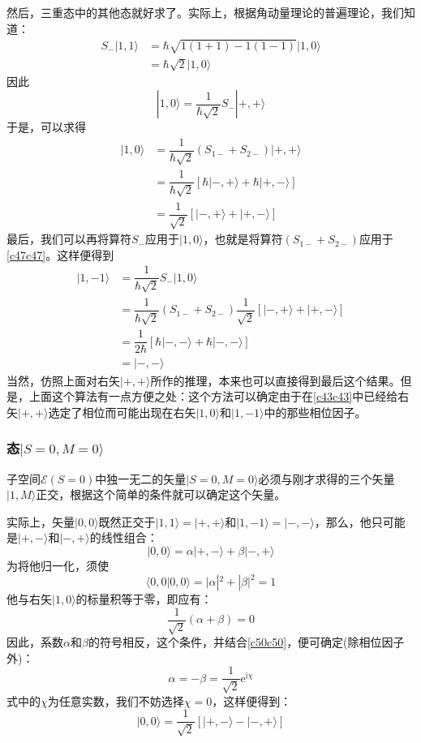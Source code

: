 \documentclass[]{article}
\begin{document}
然后，三重态中的其他态就好求了。实际上，根据角动量理论的普遍理论，我们知道：
\begin{align}
	S_-|1,1\rangle&=\hbar\sqrt{1(1+1)-1(1-1)}|1,0\rangle\nonumber\\
	&=\hbar\sqrt{2}|1,0\rangle
\end{align}
因此
\begin{equation}
	|1,0\rangle=\dfrac{1}{\hbar\sqrt{2}}S_-|+,+\rangle
	\label{c45c45}
\end{equation}
于是，可以求得
\begin{align}
	|1,0\rangle&=\dfrac{1}{\hbar\sqrt{2}}(S_{1-}+S_{2-})|+,+\rangle\nonumber\\
	&=\dfrac{1}{\hbar\sqrt{2}}[\hbar|-,+\rangle+\hbar|+,-\rangle]\nonumber\\
	&=\dfrac{1}{\sqrt{2}}[|-,+\rangle+|+,-\rangle]
	\label{c47c47}
\end{align}
最后，我们可以再将算符$S_-$应用于$|1,0\rangle$，也就是将算符$(S_{1-}+S_{2-})$应用于\eqref{c47c47}。这样便得到
\begin{align}
	|1,-1\rangle&=\dfrac{1}{\hbar\sqrt{2}}S_-|1,0\rangle\nonumber\\
	&=\dfrac{1}{\hbar\sqrt{2}}(S_{1-}+S_{2-})\dfrac{1}{\sqrt{2}}[|-,+\rangle+|+,-\rangle]\nonumber\\
	&=\dfrac{1}{2\hbar}[\hbar|-,-\rangle+\hbar|-,-\rangle]\nonumber\\
	&=|-,-\rangle
\end{align}
当然，仿照上面对右矢$|+,+\rangle$所作的推理，本来也可以直接得到最后这个结果。但是，上面这个算法有一点方便之处：这个方法可以确定由于在\eqref{c43c43}中已经给右矢$|+,+\rangle$选定了相位而可能出现在右矢$|1,0\rangle$和$|1,-1\rangle$中的那些相位因子。
\subsubsection{态$|S=0,M=0\rangle$}
子空间$\mathscr{E}(S=0)$中独一无二的矢量$|S=0,M=0\rangle$必须与刚才求得的三个矢量$|1,M\rangle$正交，根据这个简单的条件就可以确定这个矢量。\par 
实际上，矢量$|0,0\rangle$既然正交于$|1,1\rangle=|+,+\rangle$和$|1,-1\rangle=|-,-\rangle$，那么，他只可能是$|+,-\rangle$和$|-,+\rangle$的线性组合：
\begin{equation}
	|0,0\rangle=\alpha|+,-\rangle+\beta|-,+\rangle
\end{equation}
为将他归一化，须使
\begin{equation}
	\langle0,0|0,0\rangle=|\alpha|^2+|\beta|^2=1
	\label{c50c50}
\end{equation}
他与右矢$|1,0\rangle$的标量积等于零，即应有：
\begin{equation}
	\dfrac{1}{\sqrt{2}}(\alpha+\beta)=0
\end{equation}
因此，系数$\alpha$和$\beta$的符号相反，这个条件，并结合\eqref{c50c50}，便可确定(除相位因子外)：
\begin{equation}
	\alpha=-\beta=\dfrac{1}{\sqrt{2}}\mathrm{e}^{\mathrm{i}\chi}
\end{equation}
式中的$\chi$为任意实数，我们不妨选择$\chi=0$，这样便得到：
\begin{equation}
	|0,0\rangle=\dfrac{1}{\sqrt{2}}[|+,-\rangle-|-,+\rangle]
\end{equation}
\end{document}
